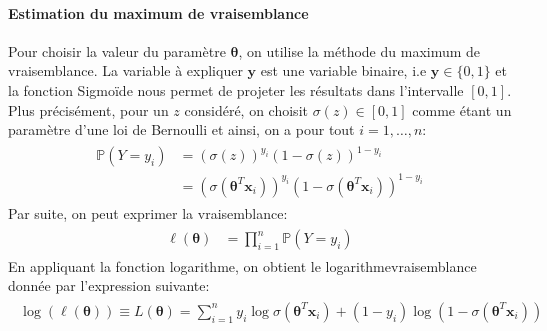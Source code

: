 \documentclass[letterpaper,11pt,english]{sphinxmanual}
\begin{document}
\paragraph{Estimation du maximum de vraisemblance}
\label{\detokenize{chapter3:estimation-du-maximum-de-vraisemblance}}
\sphinxAtStartPar
Pour choisir la valeur du paramètre \(\boldsymbol{\theta}\), on
utilise la méthode du maximum de vraisemblance. La variable à expliquer
\(\mathbf{y}\) est une variable binaire, i.e
\(\mathbf{y}\in \{0,1\}\) et la fonction Sigmoïde nous permet de
projeter les résultats dans l’intervalle \([0, 1]\). Plus
précisément, pour un \(z\) considéré, on choisit
\(\sigma (z) \in [0,1]\) comme étant un paramètre d’une loi de
Bernoulli et ainsi, on a pour tout \(i=1, \dots, n\):
\begin{equation}\label{equation:chapter3:chapter3:34}
\begin{split}\begin{aligned}
\mathbb{P}(Y=y_{i})&=\left(\sigma(z)\right)^{y_{i}}\left(1-\sigma(z)\right)^{1-y_{i}}\\
&=\left(\sigma(\boldsymbol{\theta}^T\mathbf{x}_i)\right)^{y_{i}} \left (1-\sigma(\boldsymbol{\theta}^T\mathbf{x}_i)\right)^{1-y_{i}}\end{aligned}\end{split}
\end{equation}
\sphinxAtStartPar
Par suite, on peut exprimer la vraisemblance:
\begin{equation}\label{equation:chapter3:chapter3:35}
\begin{split}\begin{aligned}
\ell(\boldsymbol{\theta})&=\prod_  {i=1}^{n}\mathbb{P}\left(Y=y_{i}\right)\end{aligned}\end{split}
\end{equation}
\sphinxAtStartPar
En appliquant la fonction logarithme, on obtient le
logarithme\sphinxhyphen{}vraisemblance donnée par l’expression suivante:
\begin{equation}\label{equation:chapter3:chapter3:36}
\begin{split}\begin{aligned}
    \log( \ell(\boldsymbol{\theta}))\equiv L(\boldsymbol{\theta})=\sum_{i=1}^{n}y_{i}\log\sigma\left(\boldsymbol{\theta}^{T}\mathbf{x}_i\right) + \left(1-y_{i}\right)\log\left(1-\sigma(\boldsymbol{\theta}^{T}\mathbf{x}_i)\right)\end{aligned}\end{split}
\end{equation}
\end{document}
